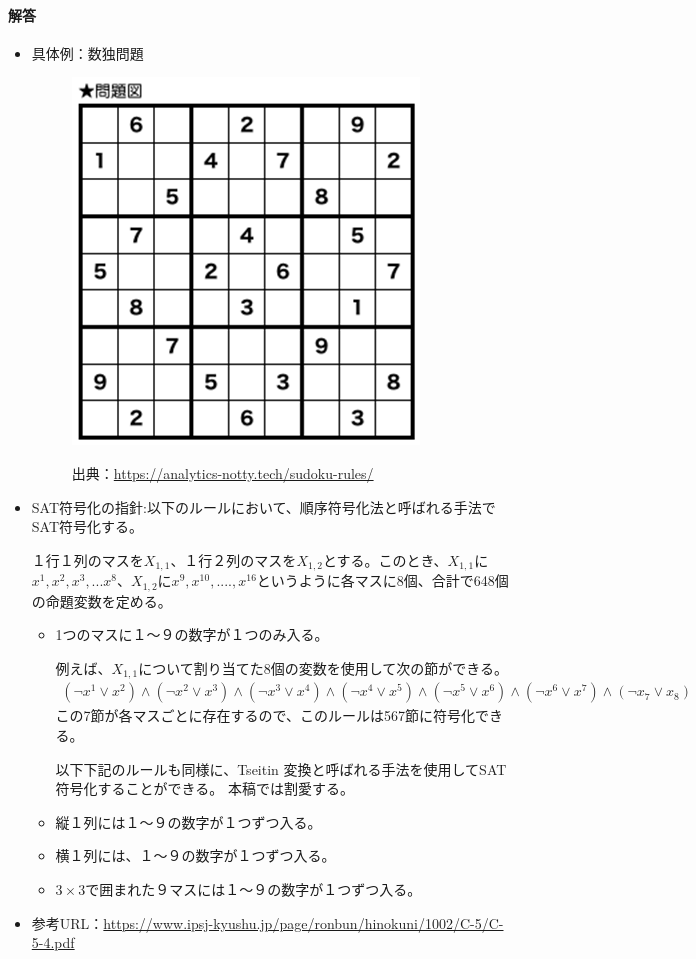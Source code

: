 \documentclass[dvipdfmx]{jsarticle}
\begin{document}
\begin{enumerate}
\paragraph{解答}\par
\begin{itemize}
  \item 具体例：数独問題
  \begin{figure}[H]
    \centering
    \includegraphics[scale=0.4]{sudoku.jpg}\par
    出典：\url{https://analytics-notty.tech/sudoku-rules/}
  \end{figure}
  \item SAT符号化の指針:以下のルールにおいて、順序符号化法と呼ばれる手法でSAT符号化する。\par
  １行１列のマスを$X_{1,1}$、１行２列のマスを$X_{1,2}$とする。このとき、$X_{1,1}$に$x^1,x^2, x^3,...x^8$、$X_{1,2}にx^{9}, x^{10}, ....,x^{16}$というように各マスに8個、合計で648個の命題変数を定める。
  \begin{itemize}
    \item 1つのマスに１〜９の数字が１つのみ入る。\par
    例えば、$X_{1,1}$について割り当てた8個の変数を使用して次の節ができる。
    \begin{align*}
      (\neg x^{1} \vee x^{2}) \wedge (\neg x^{2} \vee x^{3}) \wedge (\neg x^{3} \vee x^{4}) \wedge (\neg x^{4} \vee x^{5}) \wedge (\neg x^{5} \vee x^{6}) \wedge (\neg x^{6} \vee x^{7}) \wedge (\neg x_{7} \vee x_{8})
    \end{align*}
    この7節が各マスごとに存在するので、このルールは567節に符号化できる。\par
    以下下記のルールも同様に、Tseitin 変換と呼ばれる手法を使用してSAT符号化することができる。
    本稿では割愛する。
    \item 縦１列には１〜９の数字が１つずつ入る。\par
    \item 横１列には、１〜９の数字が１つずつ入る。
    \item $3\times 3$で囲まれた９マスには１〜９の数字が１つずつ入る。
  \end{itemize}
  \item 参考URL：\url{https://www.ipsj-kyushu.jp/page/ronbun/hinokuni/1002/C-5/C-5-4.pdf}
\end{itemize}



\end{enumerate}
\end{document}
